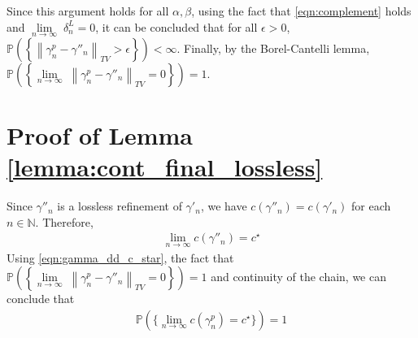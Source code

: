 \documentclass[Afour,sageh,times]{sagej}
\begin{document}
Since this argument holds for all $\alpha, \beta$, using the fact that \eqref{eqn:complement} holds and $\underset{n\rightarrow\infty}{\lim}\;\delta^L_n=0$, it can be concluded that for all $\epsilon>0$, $
\mathbb{P}\left(\left\{\left\|\gamma^p_{n}-\gamma''_{n}\right\|_{TV}>\epsilon\right\}\right)<\infty
$.
Finally, by the Borel-Cantelli lemma, $\mathbb{P}\left(\left\{\underset{n\rightarrow\infty}{\lim}\;\left\|\gamma^p_{n}-\gamma''_{n}\right\|_{TV}=0\right\}\right)=1$.
\section{Proof of Lemma \ref{lemma:cont_final_lossless}\label{appendix:cont_final_lossless}}

Since $\gamma''_n$ is a lossless refinement of $\gamma'_n$, we have $c(\gamma''_n)=c(\gamma'_n)$ for each $n\in\mathbb{N}$.
Therefore,
\begin{align}
    \lim_{n\rightarrow\infty} c(\gamma''_n)=c^\star
    \label{eqn:gamma_dd_c_star}
\end{align}
Using \eqref{eqn:gamma_dd_c_star}, the fact that $\mathbb{P}\left(\left\{\underset{n\rightarrow\infty}{\lim}\;\left\|\gamma^p_{n}-\gamma''_{n}\right\|_{TV}=0\right\}\right)=1$ and continuity of the chain, we can conclude that
\begin{align}
       \mathbb{P}(\{\lim_{n\rightarrow\infty} c(\gamma^p_n)=c^\star\})=1 
\end{align}
\end{document}
